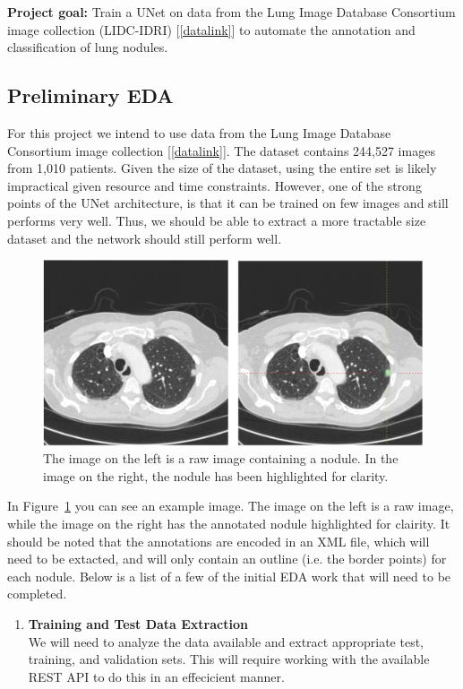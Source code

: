 \documentclass[12pt]{article}
\begin{document}
{\noindent \textbf{Project goal:} Train a UNet on data from the Lung Image Database Consortium image collection (LIDC-IDRI) [\ref{datalink}] to automate the annotation and classification of lung nodules.

\subsection*{Preliminary EDA}
\noindent  For this project we intend to use data from the Lung Image Database Consortium image collection [\ref{datalink}]. The dataset contains 244,527 images from 1,010 patients. Given the size of the dataset, using the entire set is likely impractical given resource and time constraints. However, one of the strong points of the UNet architecture, is that it can be trained on few images and still performs very well. Thus, we should be able to extract a more tractable size dataset and the network should still perform well. 

\begin{figure}
\centering
\includegraphics[width=.75\textwidth]{annotation_example}
\caption[width=.75\textwidth]{The image on the left is a raw image containing a nodule. In the image on the right, the nodule has been highlighted for clarity.}
\label{fig:img}
\end{figure}

In Figure~\ref{fig:img} you can see an example image. The image on the left is a raw image, while the image on the right has the annotated nodule highlighted for clairity. It should be noted that the annotations are encoded in an XML file, which will need to be extacted, and will only contain an outline (i.e. the border points) for each nodule. Below is a list of a few of the initial EDA work that will need to be completed. 

\begin{enumerate}
\item \textbf{Training and Test Data Extraction}\\
We will need to analyze the data available and extract appropriate test, training, and validation sets. This will require working with the available REST API to do this in an effecicient manner. 


\end{enumerate}}
\end{document}
